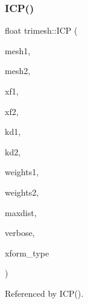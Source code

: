 \mbox{\label{namespacetrimesh_a15a6ad9c78a34388aed21cfda8a62436}} 
\subsubsection{\texorpdfstring{I\+C\+P()}{ICP()}\hspace{0.1cm}{\footnotesize\ttfamily [7/7]}}
{\footnotesize\ttfamily float trimesh\+::\+I\+CP (\begin{DoxyParamCaption}\item[{\hyperlink{classtrimesh_1_1TriMesh}{Tri\+Mesh} $\ast$}]{mesh1,  }\item[{\hyperlink{classtrimesh_1_1TriMesh}{Tri\+Mesh} $\ast$}]{mesh2,  }\item[{const \hyperlink{namespacetrimesh_ad504958f2f56e393991b848986a8459f}{xform} \&}]{xf1,  }\item[{\hyperlink{namespacetrimesh_ad504958f2f56e393991b848986a8459f}{xform} \&}]{xf2,  }\item[{const \hyperlink{classtrimesh_1_1KDtree}{K\+Dtree} $\ast$}]{kd1,  }\item[{const \hyperlink{classtrimesh_1_1KDtree}{K\+Dtree} $\ast$}]{kd2,  }\item[{vector$<$ float $>$ \&}]{weights1,  }\item[{vector$<$ float $>$ \&}]{weights2,  }\item[{float}]{maxdist,  }\item[{int}]{verbose,  }\item[{\hyperlink{namespacetrimesh_a64c747e4228158428e9cd911672cb1be}{I\+C\+P\+\_\+xform\+\_\+type}}]{xform\+\_\+type }\end{DoxyParamCaption})}



Referenced by I\+C\+P().

\mbox{\label{namespacetrimesh_a484efbede6b25125c214f658b8420947}} 
